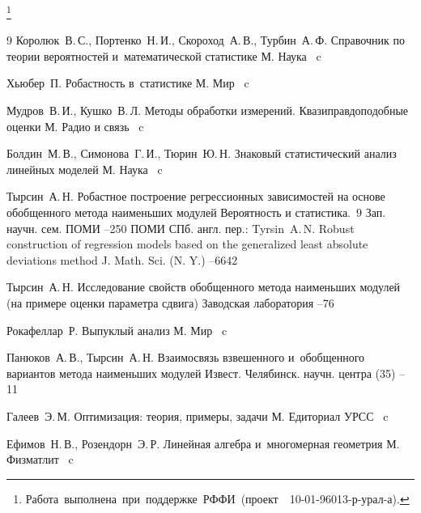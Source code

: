\thanks{\mbox{Работа выполнена при  поддержке РФФИ {\rm (}проект {\rm \No~10-01-96013-}р-урал-а{\rm).}}}

\begin{thebibliography}{9}
\by Королюк~В.\,С., Портенко~Н.\,И., Скороход~А.\,В., Турбин~А.\,Ф.
\book Справочник по теории вероятностей и~математической статистике
\publaddr М.
\publ Наука
~c

\by Хьюбер~П.
\book Робастность в~статистике
\publaddr М.
\publ Мир
~c


\by Мудров~В.\,И., Кушко~В.\,Л.
\book  Методы обработки измерений. Квазиправдоподобные оценки
\publaddr М.
\publ Радио и связь
~c


\by Болдин~М.\,В., Симонова~Г.\,И., Тюрин~Ю.\,Н.
\book Знаковый статистический анализ линейных моделей
\publaddr М.
\publ Наука
~c

\by Тырсин~А.\,Н. 
\paper Робастное построение регрессионных зависимостей на основе обобщенного метода наименьших модулей
\inbook Вероятность и статистика.~$9$
\serial Зап. научн. сем. ПОМИ
--250
\publ ПОМИ
\publaddr СПб.
\transl англ. пер.:
\by Tyrsin~A.\,N. 
\paper Robust construction of regression models based on the generalized least absolute deviations method 
\jour J. Math. Sci. (N. Y.)
--6642

\by Тырсин~А.\,Н.
\paper Исследование свойств обобщенного метода наименьших модулей (на примере оценки параметра сдвига) 
\jour Заводская лаборатория
--76


\by Рокафеллар~Р.
\book  Выпуклый анализ
\publaddr М.
\publ Мир
~c


\by Панюков~А.\,В., Тырсин~А.\,Н.
\paper Взаимосвязь взвешенного и~обобщенного вариантов метода наименьших модулей 
\jour Извест. Челябинск. научн.  центра
(35)
--11


\by Галеев~Э.\,М.
\book  Оптимизация: теория, примеры, задачи
\publaddr М.
\publ Едиториал УРСС
~c

\by Ефимов~Н.\,В., Розендорн~Э.\,Р.
\book Линейная алгебра и~многомерная геометрия
\publaddr М.
\publ Физматлит
~c

\end{thebibliography}

\makeengtitle


%
%